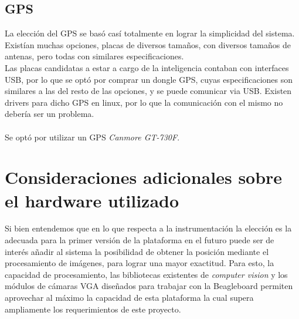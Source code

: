 \documentclass[main]{subfiles}
\begin{document}
\subsection{GPS}

La elecci\'on del GPS se bas\'o cas\'i totalmente en lograr la simplicidad del sistema. Exist\'ian muchas opciones, placas de diversos tama\~nos, con diversos tama\~nos de antenas, pero todas con similares especificaciones.\\

Las placas candidatas a estar a cargo de la inteligencia contaban con interfaces USB, por lo que se opt\'o por comprar un dongle GPS, cuyas especificaciones son similares a las del resto de las opciones, y se puede comunicar via USB. Existen drivers para dicho GPS en linux, por lo que la comunicaci\'on con el mismo no deber\'ia ser un problema.\\
\\
Se opt\'o por utilizar un GPS \textit{Canmore GT-730F}.

\section{Consideraciones adicionales sobre el hardware utilizado}

Si bien entendemos que en lo que respecta a la instrumentaci\'on la elecci\'on es la adecuada para la primer versi\'on de la plataforma en el futuro puede ser de inter\'es añadir al sistema la posibilidad de obtener la posici\'on mediante el procesamiento de im\'agenes, para lograr una mayor exactitud. Para esto, la capacidad de procesamiento, las bibliotecas existentes de \emph{computer vision} y los m\'odulos de c\'amaras VGA dise\~nados para trabajar con la Beagleboard permiten aprovechar al m\'aximo la capacidad de esta plataforma la cual supera ampliamente los requerimientos de este proyecto.\\

 
\end{document}
